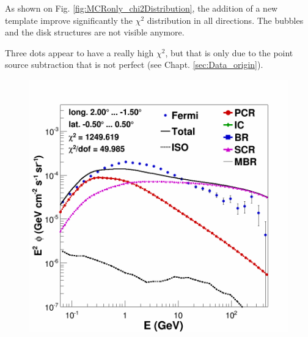 As shown on Fig. \ref{fig:MCRonly_chi2Distribution}, the addition of a new template improve significantly the $\chi^2$ distribution in all directions. The bubbles and the disk structures are not visible anymore.

Three dots appear to have a really high $\chi^2$, but that is only due to the point source subtraction that is not perfect (see Chapt. \ref{sec:Data_origin}).

\begin{figure}[h]
  \centering
  
  \begin{minipage}[h]{0.45\textwidth}
	  \centering
	  \includegraphics[width=\linewidth]{pic/results/SCRonly_CMZ.png}	  
	  \label{fig:SCRonly_CMZ}
  \end{minipage}
  \hfill
  \begin{minipage}[h]{0.45\textwidth}
	  \centering

\end{minipage}
\end{figure}
